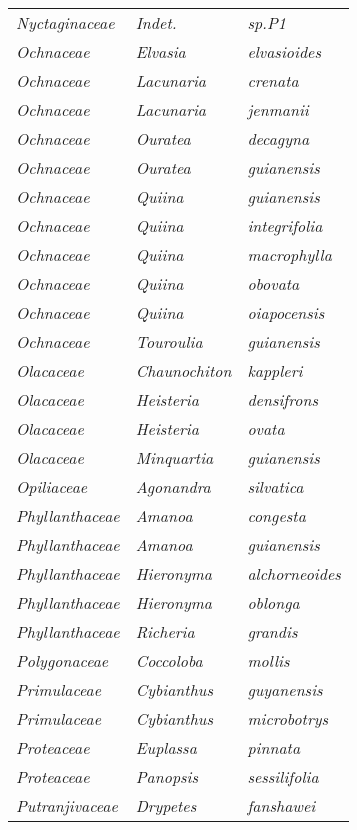 \documentclass[fleqn,10pt]{ArtEcoFoG} %
\renewenvironment{table}{\begin{table*}}{\end{table*}\ignorespacesafterend}
\begin{document}
\begin{table}
\begin{tabular}[t]{lll}
\em{Nyctaginaceae} & \em{Indet.} & \em{sp.P1}\\
\em{Ochnaceae} & \em{Elvasia} & \em{elvasioides}\\
\em{Ochnaceae} & \em{Lacunaria} & \em{crenata}\\
\addlinespace
\em{Ochnaceae} & \em{Lacunaria} & \em{jenmanii}\\
\em{Ochnaceae} & \em{Ouratea} & \em{decagyna}\\
\em{Ochnaceae} & \em{Ouratea} & \em{guianensis}\\
\em{Ochnaceae} & \em{Quiina} & \em{guianensis}\\
\em{Ochnaceae} & \em{Quiina} & \em{integrifolia}\\
\addlinespace
\em{Ochnaceae} & \em{Quiina} & \em{macrophylla}\\
\em{Ochnaceae} & \em{Quiina} & \em{obovata}\\
\em{Ochnaceae} & \em{Quiina} & \em{oiapocensis}\\
\em{Ochnaceae} & \em{Touroulia} & \em{guianensis}\\
\em{Olacaceae} & \em{Chaunochiton} & \em{kappleri}\\
\addlinespace
\em{Olacaceae} & \em{Heisteria} & \em{densifrons}\\
\em{Olacaceae} & \em{Heisteria} & \em{ovata}\\
\em{Olacaceae} & \em{Minquartia} & \em{guianensis}\\
\em{Opiliaceae} & \em{Agonandra} & \em{silvatica}\\
\em{Phyllanthaceae} & \em{Amanoa} & \em{congesta}\\
\addlinespace
\em{Phyllanthaceae} & \em{Amanoa} & \em{guianensis}\\
\em{Phyllanthaceae} & \em{Hieronyma} & \em{alchorneoides}\\
\em{Phyllanthaceae} & \em{Hieronyma} & \em{oblonga}\\
\em{Phyllanthaceae} & \em{Richeria} & \em{grandis}\\
\em{Polygonaceae} & \em{Coccoloba} & \em{mollis}\\
\addlinespace
\em{Primulaceae} & \em{Cybianthus} & \em{guyanensis}\\
\em{Primulaceae} & \em{Cybianthus} & \em{microbotrys}\\
\em{Proteaceae} & \em{Euplassa} & \em{pinnata}\\
\em{Proteaceae} & \em{Panopsis} & \em{sessilifolia}\\
\em{Putranjivaceae} & \em{Drypetes} & \em{fanshawei}\\

\end{tabular}
\end{table}
\end{document}
